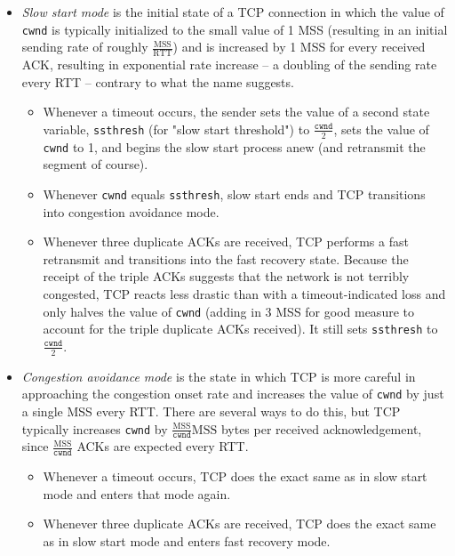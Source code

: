 \documentclass[table, xcdraw]{article}%
\begin{document}
\begin{itemize}
    \begin{itemize}
        \item \emph{Slow start mode} is the initial state of a TCP connection in which the value of \texttt{cwnd} is typically initialized to the small value of 1 MSS (resulting in an initial sending rate of roughly $\frac{\text{MSS}}{\text{RTT}}$) and is increased by 1 MSS for every received ACK, resulting in exponential rate increase -- a doubling of the sending rate every RTT -- contrary to what the name suggests.
        \begin{itemize}
            \item Whenever a timeout occurs, the sender sets the value of a second state variable, \texttt{ssthresh} (for "slow start threshold") to $\frac{\mathtt{cwnd}}{2}$, sets the value of \texttt{cwnd} to 1, and begins the slow start process anew (and retransmit the segment of course).
            \item Whenever \texttt{cwnd} equals \texttt{ssthresh}, slow start ends and TCP transitions into congestion avoidance mode.
            \item Whenever three duplicate ACKs are received, TCP performs a fast retransmit and transitions into the fast recovery state. Because the receipt of the triple ACKs suggests that the network is not terribly congested, TCP reacts less drastic than with a timeout-indicated loss and only halves the value of \texttt{cwnd} (adding in 3 MSS for good measure to account for the triple duplicate ACKs received). It still sets \texttt{ssthresh} to $\frac{\mathtt{cwnd}}{2}$.
        \end{itemize}
        \item \emph{Congestion avoidance mode} is the state in which TCP is more careful in approaching the congestion onset rate and increases the value of \texttt{cwnd} by just a single MSS every RTT. There are several ways to do this, but TCP typically increases \texttt{cwnd} by $\frac{\text{MSS}}{\mathtt{cwnd}} \text{MSS}$ bytes per received acknowledgement, since $\frac{\text{MSS}}{\mathtt{cwnd}}$ ACKs are expected every RTT.
        \begin{itemize}
            \item Whenever a timeout occurs, TCP does the exact same as in slow start mode and enters that mode again.
            \item Whenever three duplicate ACKs are received, TCP does the exact same as in slow start mode and enters fast recovery mode.

\end{itemize}
\end{itemize}
\end{itemize}
\end{document}
